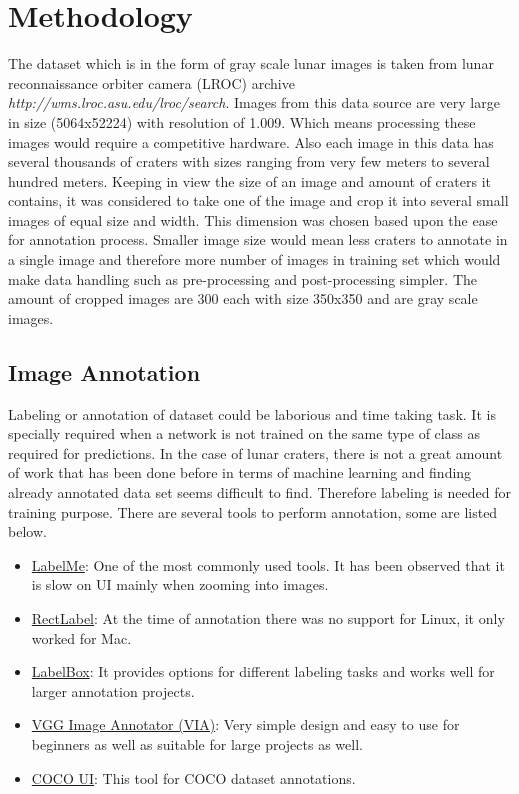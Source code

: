 \documentclass[11pt]{article}
\begin{document}
\section{Methodology}
The dataset which is in the form of gray scale lunar images is taken from lunar reconnaissance orbiter camera (LROC) archive \textit{http://wms.lroc.asu.edu/lroc/search}. Images from this data source are very large in size (5064x52224) with resolution of 1.009. Which means processing these images would require a competitive hardware. Also each image in this data has several thousands of craters with sizes ranging from very few meters to several hundred meters. Keeping in view the size of an image and amount of craters it contains, it was considered to take one of the image and crop it into several small images of equal size and width. This dimension was chosen based upon the ease for annotation process. Smaller image size would mean less craters to annotate in a single image and therefore more number of images in training set which would make data handling such as pre-processing and post-processing simpler. The amount of cropped images are 300 each with size 350x350 and are gray scale images.

\subsection{Image Annotation}
Labeling or annotation of dataset could be laborious and time taking task. It is specially required when a network is not trained on the same type of class as required for predictions. In the case of lunar craters, there is not a great amount of work that has been done before in terms of machine learning and finding already annotated data set seems difficult to find. Therefore labeling is needed for training purpose. There are several tools to perform annotation, some are listed below.
\begin{itemize}
	\item \underline{LabelMe}: One of the most commonly used tools. It has been observed that it is slow on UI mainly when zooming into images.
	\item \underline{RectLabel}: At the time of annotation there was no support for Linux, it only worked for Mac.
	\item \underline{LabelBox}: It provides options for different labeling tasks and works well for larger annotation projects.
	\item \underline{VGG Image Annotator (VIA)}: Very simple design and easy to use for beginners as well as suitable for large projects as well.
	\item \underline{COCO UI}: This tool for COCO dataset annotations.
\end{itemize}
\end{document}
